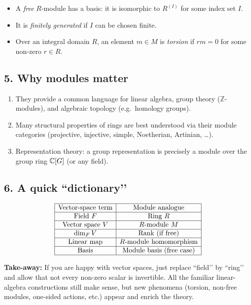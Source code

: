 \documentclass[12pt]{article}
\theoremstyle{definition} %
\theoremstyle{plain} %
\begin{document}
\begin{itemize}
   \item A \emph{free} $R$-module has a basis: it is isomorphic to
         $R^{(I)}$ for some index set $I$.
   \item It is \emph{finitely generated} if $I$ can be chosen finite.
   \item Over an integral domain $R$, an element $m\in M$ is
         \emph{torsion} if $rm=0$ for some non-zero $r\in R$.
\end{itemize}

\subsection*{5.  Why modules matter}

\begin{enumerate}
   \item They provide a common language for linear algebra,
         group theory (\(\mathbb Z\)-modules), and algebraic topology
         (e.g.\ homology groups).
   \item Many structural properties of rings are best understood via
         their module categories (projective, injective, simple,
         Noetherian, Artinian, \dots).
   \item Representation theory: a group representation is precisely a
         module over the group ring $\Bbb C[G]$ (or any field).
\end{enumerate}

\subsection*{6.  A quick “dictionary’’}

\[
\begin{array}{|c|c|}
\hline
\text{Vector-space term} & \text{Module analogue} \\ \hline
\text{Field } F & \text{Ring } R \\ \hline
\text{Vector space } V & R\text{-module } M \\ \hline
\dim_F V & \text{Rank (if free)} \\ \hline
\text{Linear map} & \text{$R$-module homomorphism} \\ \hline
\text{Basis} & \text{Module basis (free case)} \\ \hline
\end{array}
\]

\bigskip
\noindent
\textbf{Take-away:}  
If you are happy with vector spaces, just replace “field’’ by “ring’’
and allow that not every non-zero scalar is invertible.  
All the familiar linear-algebra constructions still make sense, but new
phenomena (torsion, non-free modules, one-sided actions, etc.) appear
and enrich the theory.
\end{document}
